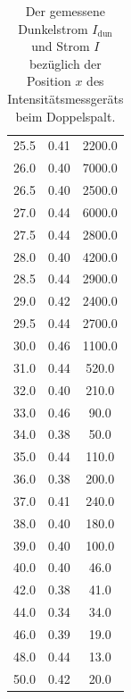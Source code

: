 \begin{table}
\begin{tabular}[t]{ccc|}
    25.5 & 0.41 & 2200.0    \\
    26.0 & 0.40 & 7000.0    \\
    26.5 & 0.40 & 2500.0    \\
    27.0 & 0.44 & 6000.0    \\
    27.5 & 0.44 & 2800.0    \\
    28.0 & 0.40 & 4200.0    \\
    28.5 & 0.44 & 2900.0    \\
    29.0 & 0.42 & 2400.0    \\
    29.5 & 0.44 & 2700.0    \\
    30.0 & 0.46 & 1100.0    \\
    31.0 & 0.44 & 520.0     \\
    32.0 & 0.40 & 210.0     \\
    33.0 & 0.46 & 90.0      \\
    34.0 & 0.38 & 50.0      \\
    35.0 & 0.44 & 110.0     \\
    36.0 & 0.38 & 200.0     \\
    37.0 & 0.41 & 240.0     \\
    38.0 & 0.40 & 180.0     \\
    39.0 & 0.40 & 100.0     \\
    40.0 & 0.40 & 46.0      \\
    42.0 & 0.38 & 41.0      \\
    44.0 & 0.34 & 34.0      \\
    46.0 & 0.39 & 19.0      \\
    48.0 & 0.44 & 13.0      \\
    50.0 & 0.42 & 20.0      \\
    \bottomrule
    \end{tabular}
    \caption{Der gemessene Dunkelstrom $I_\text{dun}$ und Strom $I$ bezüglich der Position $x$ des Intensitätsmessgeräts beim Doppelspalt.}
    \label{tab:doppel}
\end{table}